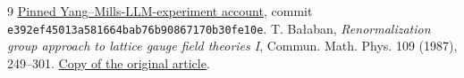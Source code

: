 \documentclass[11pt]{article}
\theoremstyle{remark}
\begin{document}
\begin{thebibliography}{9}
\href{https://github.com/ethanwsussman/Yang--Mills-LLM-experiment/tree/e392ef45013a581664bab76b90867170b30fe10e}
{Pinned Yang--Mills-LLM-experiment account}, commit
\texttt{e392ef4501\allowbreak 3a581664ba\allowbreak b76b908671\allowbreak 70b30fe10e}.
 T. Ba\l aban,
\emph{Renormalization group approach to lattice gauge field theories I},
Commun. Math. Phys. 109 (1987), 249--301.
\href{https://scispace.com/pdf/renormalization-group-approach-to-lattice-gauge-field-3ygai0vxt1.pdf}
{Copy of the original article}.
\end{thebibliography}
\end{document}
